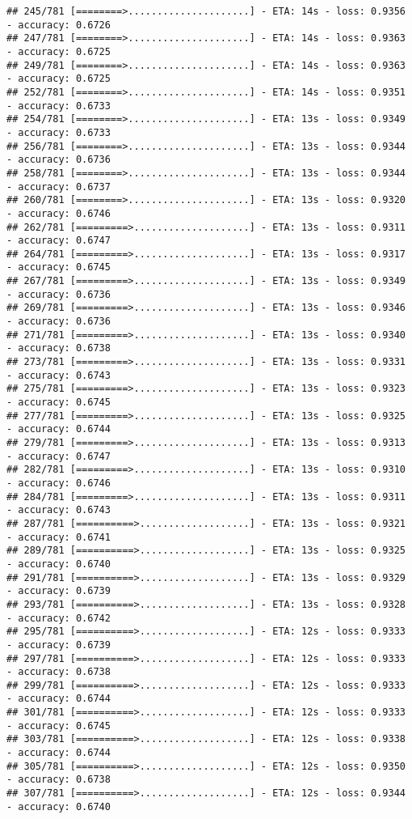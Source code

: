 \documentclass[
]{article}
\begin{document}
\begin{verbatim}
## 245/781 [========>.....................] - ETA: 14s - loss: 0.9356 - accuracy: 0.6726
## 247/781 [========>.....................] - ETA: 14s - loss: 0.9363 - accuracy: 0.6725
## 249/781 [========>.....................] - ETA: 14s - loss: 0.9363 - accuracy: 0.6725
## 252/781 [========>.....................] - ETA: 14s - loss: 0.9351 - accuracy: 0.6733
## 254/781 [========>.....................] - ETA: 13s - loss: 0.9349 - accuracy: 0.6733
## 256/781 [========>.....................] - ETA: 13s - loss: 0.9344 - accuracy: 0.6736
## 258/781 [========>.....................] - ETA: 13s - loss: 0.9344 - accuracy: 0.6737
## 260/781 [========>.....................] - ETA: 13s - loss: 0.9320 - accuracy: 0.6746
## 262/781 [=========>....................] - ETA: 13s - loss: 0.9311 - accuracy: 0.6747
## 264/781 [=========>....................] - ETA: 13s - loss: 0.9317 - accuracy: 0.6745
## 267/781 [=========>....................] - ETA: 13s - loss: 0.9349 - accuracy: 0.6736
## 269/781 [=========>....................] - ETA: 13s - loss: 0.9346 - accuracy: 0.6736
## 271/781 [=========>....................] - ETA: 13s - loss: 0.9340 - accuracy: 0.6738
## 273/781 [=========>....................] - ETA: 13s - loss: 0.9331 - accuracy: 0.6743
## 275/781 [=========>....................] - ETA: 13s - loss: 0.9323 - accuracy: 0.6745
## 277/781 [=========>....................] - ETA: 13s - loss: 0.9325 - accuracy: 0.6744
## 279/781 [=========>....................] - ETA: 13s - loss: 0.9313 - accuracy: 0.6747
## 282/781 [=========>....................] - ETA: 13s - loss: 0.9310 - accuracy: 0.6746
## 284/781 [=========>....................] - ETA: 13s - loss: 0.9311 - accuracy: 0.6743
## 287/781 [==========>...................] - ETA: 13s - loss: 0.9321 - accuracy: 0.6741
## 289/781 [==========>...................] - ETA: 13s - loss: 0.9325 - accuracy: 0.6740
## 291/781 [==========>...................] - ETA: 13s - loss: 0.9329 - accuracy: 0.6739
## 293/781 [==========>...................] - ETA: 13s - loss: 0.9328 - accuracy: 0.6742
## 295/781 [==========>...................] - ETA: 12s - loss: 0.9333 - accuracy: 0.6739
## 297/781 [==========>...................] - ETA: 12s - loss: 0.9333 - accuracy: 0.6738
## 299/781 [==========>...................] - ETA: 12s - loss: 0.9333 - accuracy: 0.6744
## 301/781 [==========>...................] - ETA: 12s - loss: 0.9333 - accuracy: 0.6745
## 303/781 [==========>...................] - ETA: 12s - loss: 0.9338 - accuracy: 0.6744
## 305/781 [==========>...................] - ETA: 12s - loss: 0.9350 - accuracy: 0.6738
## 307/781 [==========>...................] - ETA: 12s - loss: 0.9344 - accuracy: 0.6740

\end{verbatim}
\end{document}
